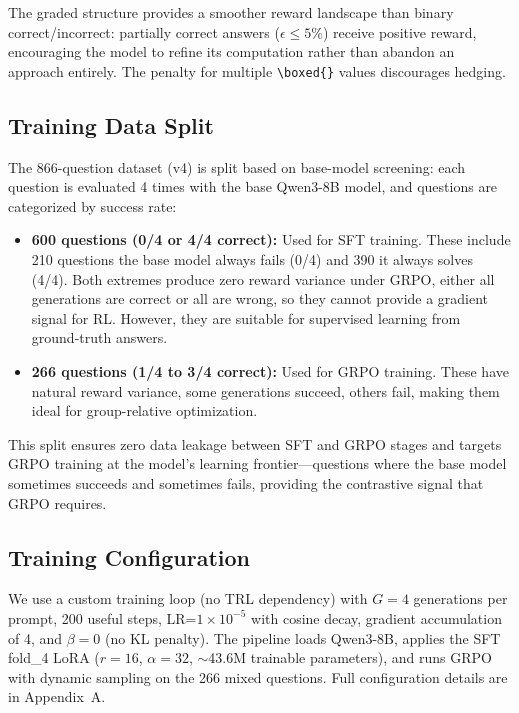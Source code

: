 The graded structure provides a smoother reward landscape than binary correct/incorrect: partially correct answers ($\epsilon \leq 5\%$) receive positive reward, encouraging the model to refine its computation rather than abandon an approach entirely. The penalty for multiple \verb|\boxed{}| values discourages hedging.

\subsection{Training Data Split}
\label{sec:grpo:split}

The 866-question dataset (v4) is split based on base-model screening: each question is evaluated 4 times with the base Qwen3-8B model, and questions are categorized by success rate:

\begin{itemize}
    \item \textbf{600 questions (0/4 or 4/4 correct):} Used for SFT training. These include 210 questions the base model always fails (0/4) and 390 it always solves (4/4). Both extremes produce zero reward variance under GRPO, either all generations are correct or all are wrong, so they cannot provide a gradient signal for RL. However, they are suitable for supervised learning from ground-truth answers.
    \item \textbf{266 questions (1/4 to 3/4 correct):} Used for GRPO training. These have natural reward variance, some generations succeed, others fail, making them ideal for group-relative optimization.
\end{itemize}

This split ensures zero data leakage between SFT and GRPO stages and targets GRPO training at the model's learning frontier---questions where the base model sometimes succeeds and sometimes fails, providing the contrastive signal that GRPO requires.

\subsection{Training Configuration}
\label{sec:grpo:config}

We use a custom training loop (no TRL dependency) with $G\!=\!4$ generations per prompt, 200 useful steps, LR=$1\!\times\!10^{-5}$ with cosine decay, gradient accumulation of 4, and $\beta\!=\!0$ (no KL penalty). The pipeline loads Qwen3-8B, applies the SFT fold\_4 LoRA ($r\!=\!16$, $\alpha\!=\!32$, $\sim$43.6M trainable parameters), and runs GRPO with dynamic sampling on the 266 mixed questions. Full configuration details are in Appendix~A.

